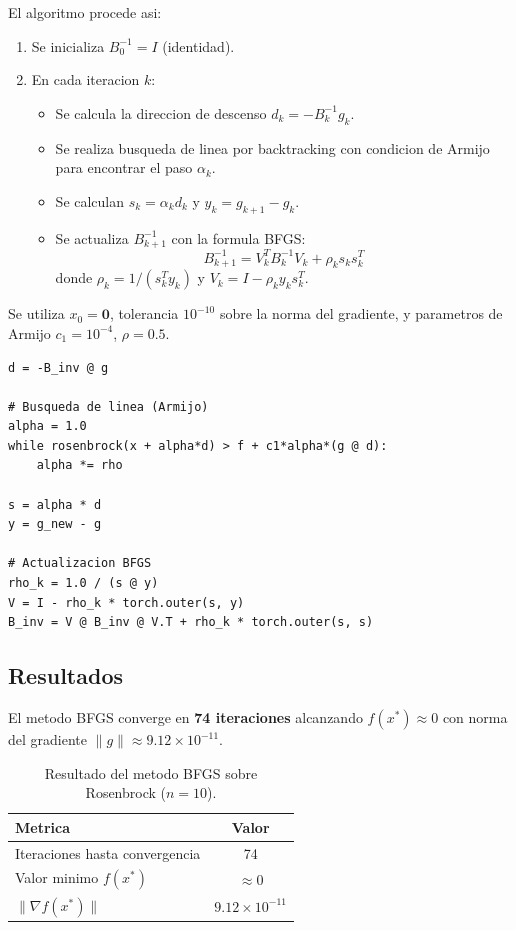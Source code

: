 \documentclass{article}
\begin{document}
El algoritmo procede asi:
\begin{enumerate}
    \item Se inicializa $B_0^{-1} = I$ (identidad).
    \item En cada iteracion $k$:
    \begin{itemize}
        \item Se calcula la direccion de descenso $d_k = -B_k^{-1} g_k$.
        \item Se realiza busqueda de linea por backtracking con condicion de Armijo para encontrar el paso $\alpha_k$.
        \item Se calculan $s_k = \alpha_k d_k$ y $y_k = g_{k+1} - g_k$.
        \item Se actualiza $B_{k+1}^{-1}$ con la formula BFGS:
        \[
        B_{k+1}^{-1} = V_k^T B_k^{-1} V_k + \rho_k s_k s_k^T
        \]
        donde $\rho_k = 1 / (s_k^T y_k)$ y $V_k = I - \rho_k y_k s_k^T$.
    \end{itemize}
\end{enumerate}

Se utiliza $x_0 = \mathbf{0}$, tolerancia $10^{-10}$ sobre la norma del gradiente, y parametros de Armijo $c_1 = 10^{-4}$, $\rho = 0.5$.

\begin{lstlisting}
d = -B_inv @ g

# Busqueda de linea (Armijo)
alpha = 1.0
while rosenbrock(x + alpha*d) > f + c1*alpha*(g @ d):
    alpha *= rho

s = alpha * d
y = g_new - g

# Actualizacion BFGS
rho_k = 1.0 / (s @ y)
V = I - rho_k * torch.outer(s, y)
B_inv = V @ B_inv @ V.T + rho_k * torch.outer(s, s)
\end{lstlisting}

\subsection{Resultados}

El metodo BFGS converge en \textbf{74 iteraciones} alcanzando $f(x^*) \approx 0$ con norma del gradiente $\|g\| \approx 9.12 \times 10^{-11}$.

\begin{table}[H]
\centering
\begin{tabular}{lc}
\hline
\textbf{Metrica} & \textbf{Valor} \\
\hline
Iteraciones hasta convergencia & 74 \\
Valor minimo $f(x^*)$ & $\approx 0$ \\
$\|\nabla f(x^*)\|$ & $9.12 \times 10^{-11}$ \\
\hline
\end{tabular}
\caption{Resultado del metodo BFGS sobre Rosenbrock ($n=10$).}
\label{tab:p4_result}
\end{table}
\end{document}
